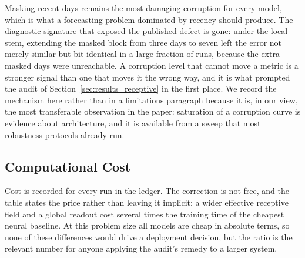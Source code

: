 
Masking recent days remains the most damaging corruption for every model, which is what a forecasting problem dominated by recency should produce. The diagnostic signature that exposed the published defect is gone: under the local stem, extending the masked block from three days to seven left the error not merely similar but bit-identical in a large fraction of runs, because the extra masked days were unreachable. A corruption level that cannot move a metric is a stronger signal than one that moves it the wrong way, and it is what prompted the audit of Section~\ref{sec:results_receptive} in the first place. We record the mechanism here rather than in a limitations paragraph because it is, in our view, the most transferable observation in the paper: saturation of a corruption curve is evidence about architecture, and it is available from a sweep that most robustness protocols already run.

\subsection{Computational Cost}
\label{sec:results_efficiency}


Cost is recorded for every run in the ledger. The correction is not free, and the table states the price rather than leaving it implicit: a wider effective receptive field and a global readout cost several times the training time of the cheapest neural baseline. At this problem size all models are cheap in absolute terms, so none of these differences would drive a deployment decision, but the ratio is the relevant number for anyone applying the audit's remedy to a larger system.
